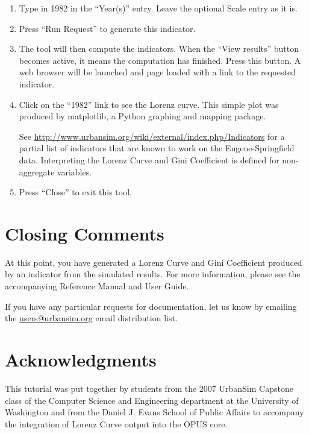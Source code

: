 \documentclass{howto}
\begin{document}
\begin{enumerate}
\item Type in 1982 in the ``Year(s)'' entry. Leave the optional Scale entry as it is.

\item Press ``Run Request'' to generate this indicator.

\item The tool will then compute the indicators. When the
``View results'' button becomes active, it means the computation has finished.
Press this button. A web
browser will be launched and page loaded with a link to the requested indicator.

\item Click on the ``1982'' link to see the Lorenz curve. This simple plot was
produced by matplotlib, a Python graphing and mapping package.  


See \url{http://www.urbansim.org/wiki/external/index.php/Indicators} for a
partial list of indicators that are known to work on the Eugene-Springfield
data.  Interpreting the Lorenz Curve and Gini Coefficient is defined for non-aggregate
variables.  

\item Press ``Close'' to exit this tool.

\end{enumerate}

\section*{Closing Comments}

At this point, you have generated a Lorenz Curve and Gini Coefficient 
produced by an indicator from the simulated results. 
For more information, please see the accompanying Reference Manual and User Guide. 

If you have any particular requests for documentation, let us know by emailing
the \url{users@urbansim.org} email distribution list.

\section*{Acknowledgments}

This tutorial was put together by students from the 2007 UrbanSim Capstone class of the Computer
Science and Engineering department at the University of Washington
and from the Daniel J. Evans School of Public Affairs to accompany the integration
of Lorenz Curve output into the OPUS core.
\end{document}
